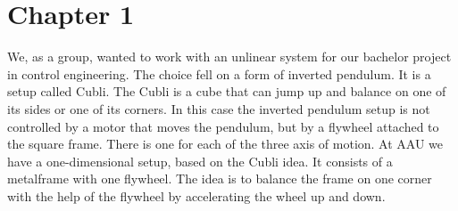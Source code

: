 \chapter{Chapter 1}
We, as a group, wanted to work with an unlinear system for our bachelor project in control engineering. The choice fell on a form of inverted pendulum. It is a setup called Cubli.
The Cubli is a cube that can jump up and balance on one of its sides or one of its corners.\cite{MGajamohan}
In this case the inverted pendulum setup is not controlled by a motor that moves the pendulum, but by a flywheel attached to the square frame. There is one for each of the three axis of motion. 
At AAU we have a one-dimensional setup, based on the Cubli idea. It consists of a metalframe with one flywheel. The idea is to balance the frame on one corner with the help of the flywheel by accelerating the wheel up and down.
